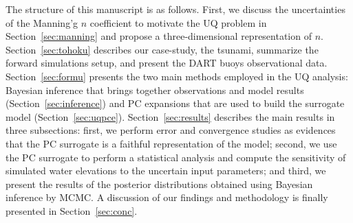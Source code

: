 The structure of this manuscript is as follows. First, we discuss the uncertainties 
of the Manning'g $n$ coefficient to motivate the UQ problem in Section~\ref{sec:manning}
and propose a three-dimensional representation of $n$. 
Section~\ref{sec:tohoku} describes our case-study, the \tohoku tsunami,
summarize the forward simulations setup, and present the DART buoys observational data. 
Section~\ref{sec:formu} presents the two main methods employed in the UQ analysis:
Bayesian inference that brings together observations 
and model results (Section~\ref{sec:inference}) 
and PC expansions that are used to build the surrogate model (Section~\ref{sec:uqpce}). Section~\ref{sec:results} describes the main results in 
three subsections: first, we perform error and convergence studies
as evidences that the PC surrogate is a faithful 
representation of the \geoclaw model; second, we use the PC surrogate to 
perform a statistical analysis and compute the  sensitivity of simulated water elevations
to the uncertain input parameters; and third, we present the results of the
posterior distributions obtained using Bayesian inference by MCMC. A discussion of our findings and methodology is finally presented in Section~\ref{sec:conc}.